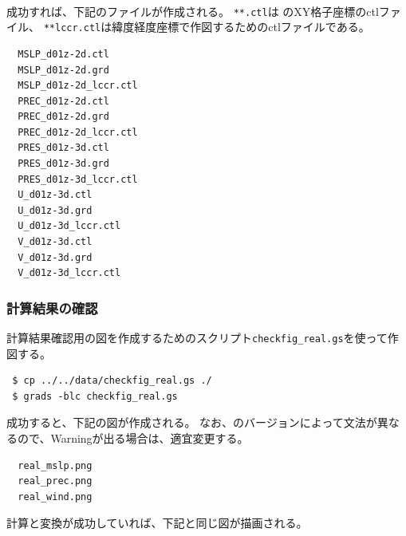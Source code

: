 \\

成功すれば、下記のファイルが作成される。
\verb|**.ctl|は {\scalerm} のXY格子座標のctlファイル、
\verb|**lccr.ctl|は緯度経度座標で作図するためのctlファイルである。

\begin{verbatim}
  MSLP_d01z-2d.ctl
  MSLP_d01z-2d.grd
  MSLP_d01z-2d_lccr.ctl
  PREC_d01z-2d.ctl
  PREC_d01z-2d.grd
  PREC_d01z-2d_lccr.ctl
  PRES_d01z-3d.ctl
  PRES_d01z-3d.grd
  PRES_d01z-3d_lccr.ctl
  U_d01z-3d.ctl
  U_d01z-3d.grd
  U_d01z-3d_lccr.ctl
  V_d01z-3d.ctl
  V_d01z-3d.grd
  V_d01z-3d_lccr.ctl
\end{verbatim}




\subsubsection{計算結果の確認}


計算結果確認用の図を作成するための\grads スクリプト\verb|checkfig_real.gs|を使って作図する。
\begin{verbatim}
 $ cp ../../data/checkfig_real.gs ./
 $ grads -blc checkfig_real.gs
\end{verbatim}
成功すると、下記の図が作成される。
なお、\grads のバージョンによって文法が異なるので、Warningが出る場合は、適宜変更する。
\begin{verbatim}
  real_mslp.png
  real_prec.png
  real_wind.png
\end{verbatim}
計算と変換が成功していれば、下記と同じ図が描画される。


